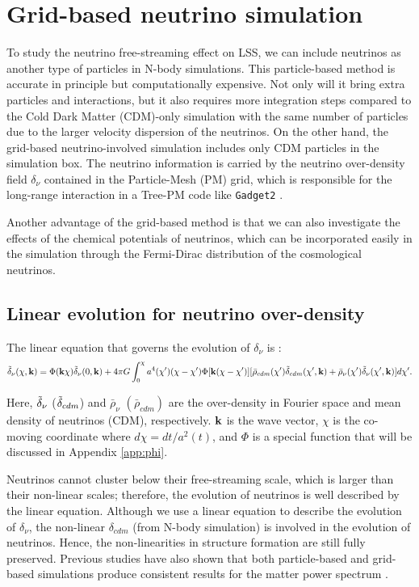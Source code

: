 \section{Grid-based neutrino simulation}
\label{sec:grid}

To study the neutrino free-streaming effect on LSS, we can include neutrinos as another type of particles in N-body simulations. This particle-based method is accurate in principle but computationally expensive.
Not only will it bring extra particles and interactions, but it also requires more integration steps compared to the Cold Dark Matter (CDM)-only simulation with the same number of particles due to the larger velocity dispersion of the neutrinos. 
On the other hand, the grid-based neutrino-involved simulation includes only CDM particles in the simulation box. The neutrino information is carried by the neutrino over-density field $\delta_\nu$ contained in the Particle-Mesh (PM) grid, which is responsible for the long-range interaction in a Tree-PM code like \texttt{Gadget2} \cite{Gadget2}. 

Another advantage of the grid-based method is that we can also investigate the effects of the chemical potentials of neutrinos, which can be incorporated easily in the simulation through the Fermi-Dirac distribution of the cosmological neutrinos.

\subsection{Linear evolution for neutrino over-density}
The linear equation that governs the evolution of $\delta_\nu$ is \cite{LBE}: 
\begin{equation}
\label{eq:LBE}
    \Tilde{\delta}_\nu (\chi,\mathbf{k}) = \Phi(\mathbf{k}\chi) \Tilde{\delta}_\nu(0,\mathbf{k}) +
    4\pi G \int^\chi_0 a^4(\chi')(\chi-\chi') \Phi[\mathbf{k}(\chi-\chi')]
    [\Bar{\rho}_{cdm}(\chi') \Tilde{\delta}_{cdm} (\chi',\mathbf{k}) + \Bar{\rho}_\nu(\chi') \Tilde{\delta}_\nu (\chi',\mathbf{k})] d\chi'.
\end{equation}


Here, $\Tilde{\delta}_\nu$ ($\Tilde{\delta}_{cdm}$) and $\bar \rho_\nu$  $(\bar\rho_{cdm})$ are the over-density in Fourier space and mean density of neutrinos (CDM), respectively. $\bf k$ is the wave vector, $\chi$ is the co-moving coordinate where $d\chi=dt/a^2(t)$, and $\Phi$ is a special function that will be discussed in Appendix \ref{app:phi}.

Neutrinos cannot cluster below their free-streaming scale, which is larger than their non-linear scales; therefore, the evolution of neutrinos is well described by the linear equation. Although we use a linear equation to describe the evolution of $\delta_\nu$, the non-linear $\delta_{cdm}$ (from N-body simulation) is involved in the evolution of neutrinos. Hence, the non-linearities in structure formation are still fully preserved. 
Previous studies have also shown that both particle-based and grid-based simulations produce consistent results for the matter power spectrum \cite{Carton}. 


